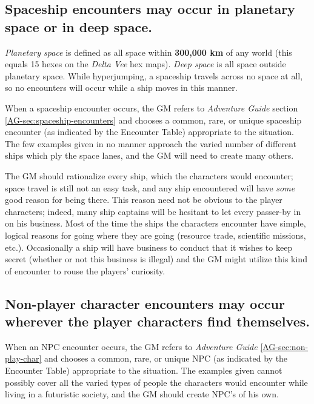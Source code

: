 \subsection[Spaceship Encounters]{Spaceship encounters may occur in
  planetary space or in deep space.} 
\label{sec:spaceship-encounters}



\emph{Planetary space} is defined as all space within \textbf{300,000
  km} of any world (this equals 15 hexes on the \emph{Delta Vee} hex
maps). \emph{Deep space} is all space outside planetary space. While
hyperjumping, a spaceship travels across no space at all, so no
encounters will occur while a ship moves in this manner.

When a spaceship encounter occurs, the GM refers to \emph{Adventure
  Guide} section \ref{AG-sec:spaceship-encounters}
and chooses a common, rare, or unique spaceship encounter (as
indicated by the Encounter Table) appropriate to the situation. The
few examples given in no manner approach the varied number of
different ships which ply the space lanes, and the GM will need to
create many others.

The GM should rationalize every ship, which the characters would
encounter; space travel is still not an easy task, and any ship
encountered will have \emph{some} good reason for being there. This
reason need not be obvious to the player characters; indeed, many ship
captains will be hesitant to let every passer-by in on his business.
Most of the time the ships the characters encounter have simple,
logical reasons for going where they are going (resource trade,
scientific missions, etc.). Occasionally a ship will have business to
conduct that it wishes to keep secret (whether or not this business is
illegal) and the GM might utilize this kind of encounter to rouse the
players' curiosity.


\subsection[Non-player Characters]{Non-player character encounters may
  occur wherever the player characters find themselves.} 
\label{sec:non-player-character}

When an NPC encounter occurs, the GM refers to \emph{Adventure Guide}
\ref{AG-sec:non-play-char} and 
chooses a common, rare, or unique NPC (as indicated by the Encounter
Table) appropriate to the situation. The examples given cannot
possibly cover all the varied types of people the characters would
encounter while living in a futuristic society, and the GM should
create NPC's of his own.

